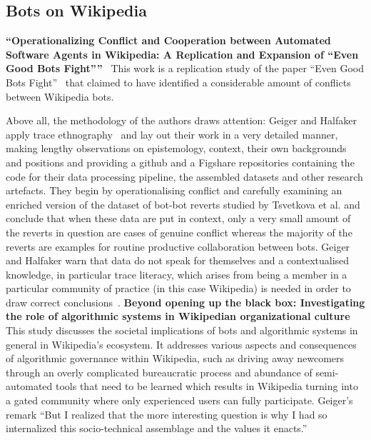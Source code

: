 \documentclass[pdftex,a4paper,11pt]{scrartcl}
\begin{document}
\subsection{Bots on Wikipedia}
\textbf{``Operationalizing Conflict and Cooperation between Automated Software Agents in Wikipedia: A Replication and Expansion of “Even Good Bots Fight”''}~\cite{GeiHal2017}
\newline
\newline
This work is a replication study of the paper ``Even Good Bots Fight''~\cite{TsvetkovaEtAl2017} that claimed to have identified a considerable amount of conflicts between Wikipedia bots.

Above all, the methodology of the authors draws attention: Geiger and Halfaker apply trace ethnography~\cite{GeiRib2011} and lay out their work in a very detailed manner, making lengthy observations on epistemology, context, their own backgrounds and positions and providing a github and a Figshare repositories containing the code for their data processing pipeline, the assembled datasets and other research artefacts.
They begin by operationalising conflict and carefully examining an enriched version of the dataset of bot-bot reverts studied by Tsvetkova et al. and conclude that when these data are put in context, only a very small amount of the reverts in question are cases of genuine conflict whereas the majority of the reverts are examples for routine productive collaboration between bots.
Geiger and Halfaker warn that data do not speak for themselves and a contextualised knowledge, in particular trace literacy, which arises from being a member in a particular community of practice (in this case Wikipedia) is needed in order to draw correct conclusions~\cite{GeiHal2017}.
\newline
\newline
\textbf{Beyond opening up the black box: Investigating the role of algorithmic systems in Wikipedian organizational culture}~\cite{Geiger2017}
\newline
\newline
This study discusses the societal implications of bots and algorithmic systems in general in Wikipedia's ecosystem.
It addresses various aspects and consequences of algorithmic governance within Wikipedia, such as driving away newcomers through an overly complicated bureaucratic process and abundance of semi-automated tools that need to be learned which results in Wikipedia turning into a gated community where only experienced users can fully participate.
Geiger's remark
``But I realized that the more interesting question is why I had so internalized this socio-technical assemblage and the values it enacts.''
\end{document}
